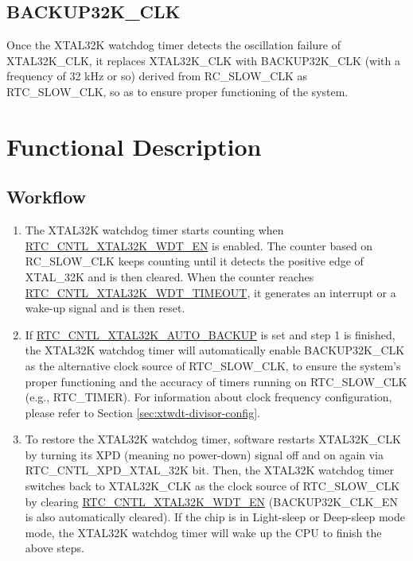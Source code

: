 \documentclass[main\_\_EN.tex]{subfiles}
\begin{document}
\subsection{BACKUP32K\_CLK}

Once the XTAL32K watchdog timer detects the oscillation failure of XTAL32K\_CLK, it replaces XTAL32K\_CLK with BACKUP32K\_CLK (with a frequency of 32 kHz or so) derived from RC\_SLOW\_CLK as RTC\_SLOW\_CLK, so as to ensure proper functioning of the system.

\section{Functional Description}

\subsection{Workflow}

\begin{enumerate}
    \item The XTAL32K watchdog timer starts counting when \hyperref[fielddesc:RTCCNTLXTAL32KWDTEN]{RTC\_CNTL\_XTAL32K\_WDT\_EN} is enabled. The counter based on RC\_SLOW\_CLK keeps counting until it detects the positive edge of XTAL\_32K and is then cleared. When the counter reaches \hyperref[fielddesc:RTCCNTLXTAL32KWDTTIMEOUT]{RTC\_CNTL\_XTAL32K\_WDT\_TIMEOUT}, it generates an interrupt or a wake-up signal and is then reset.
    \item If \hyperref[fielddesc:RTCCNTLXTAL32KAUTOBACKUP]{RTC\_CNTL\_XTAL32K\_AUTO\_BACKUP} is set and step 1 is finished, the XTAL32K watchdog timer will automatically enable BACKUP32K\_CLK as the alternative clock source of RTC\_SLOW\_CLK, to ensure the system's proper functioning and the accuracy of timers running on RTC\_SLOW\_CLK (e.g., RTC\_TIMER). For information about clock frequency configuration, please refer to Section \ref{sec:xtwdt-divisor-config}.
    \item To restore the XTAL32K watchdog timer, software restarts XTAL32K\_CLK by turning its XPD (meaning no power-down) signal off and on again via RTC\_CNTL\_XPD\_XTAL\_32K bit. Then, the XTAL32K watchdog timer switches back to XTAL32K\_CLK as the clock source of RTC\_SLOW\_CLK by clearing \hyperref[fielddesc:RTCCNTLXTAL32KWDTEN]{RTC\_CNTL\_XTAL32K\_WDT\_EN} (BACKUP32K\_CLK\_EN is also automatically cleared). If the chip is in Light-sleep or Deep-sleep mode mode, the XTAL32K watchdog timer will wake up the CPU to finish the above steps.
\end{enumerate}
\end{document}
